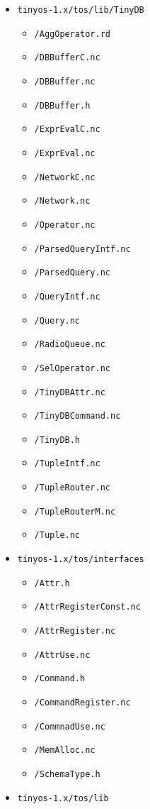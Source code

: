 \documentclass[11pt]{article}
\renewcommand{\baselinestretch}{1.2}
\newcommand{\docroot}{tinyos-1.x}
\begin{document}
\renewcommand{\baselinestretch}{.9}\rm
\begin{itemize}
\item {\tt \docroot/tos/lib/TinyDB}
\begin{itemize}
\item {\tt /AggOperator.rd}
\item {\tt /DBBufferC.nc}
\item {\tt /DBBuffer.nc}
\item {\tt /DBBuffer.h}
\item {\tt /ExprEvalC.nc}
\item {\tt /ExprEval.nc}
\item {\tt /NetworkC.nc}
\item {\tt /Network.nc}
\item {\tt /Operator.nc}
\item {\tt /ParsedQueryIntf.nc}
\item {\tt /ParsedQuery.nc}
\item {\tt /QueryIntf.nc}
\item {\tt /Query.nc}
\item {\tt /RadioQueue.nc}
\item {\tt /SelOperator.nc}
\item {\tt /TinyDBAttr.nc}
\item {\tt /TinyDBCommand.nc}
\item {\tt /TinyDB.h}
\item {\tt /TupleIntf.nc}
\item {\tt /TupleRouter.nc}
\item {\tt /TupleRouterM.nc}
\item {\tt /Tuple.nc}
\end{itemize}
\item {\tt \docroot/tos/interfaces}
\begin{itemize}
\item {\tt /Attr.h}
\item {\tt /AttrRegisterConst.nc}
\item {\tt /AttrRegister.nc}
\item {\tt /AttrUse.nc}
\item {\tt /Command.h}
\item {\tt /CommandRegister.nc}
\item {\tt /CommnadUse.nc}
\item {\tt /MemAlloc.nc}
\item {\tt /SchemaType.h}
\end{itemize}
\item {\tt \docroot/tos/lib}
\begin{itemize}

\end{itemize}
\end{itemize}
\end{document}
